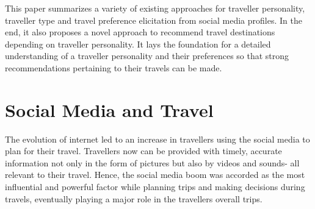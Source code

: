 
This paper summarizes a variety of existing approaches for traveller personality, traveller type and travel preference elicitation from social media profiles. In the end, it also proposes a novel approach to recommend travel destinations depending on traveller personality. It lays the foundation for a detailed understanding of a traveller personality and their preferences so that strong recommendations pertaining to their travels can be made. 








\section{Social Media and Travel}\label{1}

The evolution of internet led to an increase in travellers using the social media to plan for their travel. Travellers now can be provided with timely, accurate information not only in the form of pictures but also by videos and sounds- all relevant to their travel. Hence, the social media boom was accorded as the most influential and powerful factor while planning trips and making decisions during travels, eventually playing a major role in the traveller\textquotesingle s overall trips.

